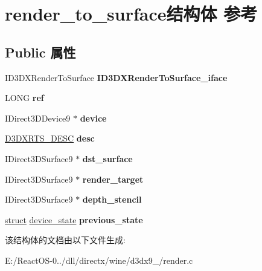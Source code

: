 \hypertarget{structrender__to__surface}{}\section{render\+\_\+to\+\_\+surface结构体 参考}
\label{structrender__to__surface}
\subsection*{Public 属性}
\begin{DoxyCompactItemize}
\item 
\mbox{\label{structrender__to__surface_a6556185941a39b3b939f3c9559caf879}} 
I\+D3\+D\+X\+Render\+To\+Surface {\bfseries I\+D3\+D\+X\+Render\+To\+Surface\+\_\+iface}
\item 
\mbox{\label{structrender__to__surface_a6cf5aa636ca08a3096a47b4874b28bc2}} 
L\+O\+NG {\bfseries ref}
\item 
\mbox{\label{structrender__to__surface_a7451ea29a56b754fc332e11b5be4dd74}} 
I\+Direct3\+D\+Device9 $\ast$ {\bfseries device}
\item 
\mbox{\label{structrender__to__surface_a6fabb15f1fec9f9fa2c4495e00cc749c}} 
\hyperlink{struct___d3_d_x_r_t_s___d_e_s_c}{D3\+D\+X\+R\+T\+S\+\_\+\+D\+E\+SC} {\bfseries desc}
\item 
\mbox{\label{structrender__to__surface_a92acbd63fb3aa3749ab350ae10f51029}} 
I\+Direct3\+D\+Surface9 $\ast$ {\bfseries dst\+\_\+surface}
\item 
\mbox{\label{structrender__to__surface_af00d2107ee982237d25e0fa6b06e3da1}} 
I\+Direct3\+D\+Surface9 $\ast$ {\bfseries render\+\_\+target}
\item 
\mbox{\label{structrender__to__surface_a3781d2e4ab33cc4b72de5781a1ebfb2f}} 
I\+Direct3\+D\+Surface9 $\ast$ {\bfseries depth\+\_\+stencil}
\item 
\mbox{\label{structrender__to__surface_ad222baa97565598a5fe7c21e25176800}} 
\hyperlink{interfacestruct}{struct} \hyperlink{structdevice__state}{device\+\_\+state} {\bfseries previous\+\_\+state}
\end{DoxyCompactItemize}


该结构体的文档由以下文件生成\+:\begin{DoxyCompactItemize}
\item 
E\+:/\+React\+O\+S-\/0../dll/directx/wine/d3dx9\+\_/render.\+c\end{DoxyCompactItemize}

